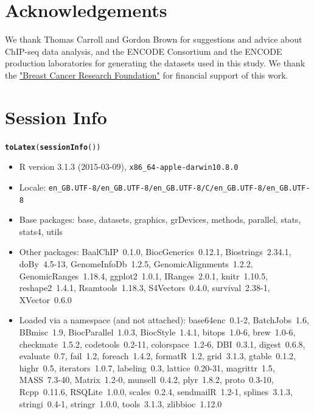 \documentclass{article}\usepackage[]{graphicx}\usepackage[usenames,dvipsnames]{color}
\makeatletter
\newcommand{\hlstd}[1]{\textcolor[rgb]{0.345,0.345,0.345}{#1}}%
\newcommand{\hlkwd}[1]{\textcolor[rgb]{0.737,0.353,0.396}{\textbf{#1}}}%
\newenvironment{kframe}{%
 \def\at@end@of@kframe{}%
 \ifinner\ifhmode%
  \def\at@end@of@kframe{\end{minipage}}%
  \begin{minipage}{\columnwidth}%
 \fi\fi%
 \def\FrameCommand##1{\hskip\@totalleftmargin \hskip-\fboxsep
 \colorbox{shadecolor}{##1}\hskip-\fboxsep
     \hskip-\linewidth \hskip-\@totalleftmargin \hskip\columnwidth}%
 \MakeFramed {\advance\hsize-\width
   \@totalleftmargin\z@ \linewidth\hsize
   \@setminipage}}%
 {\par\unskip\endMakeFramed%
 \at@end@of@kframe}
\makeatother
\begin{document}



\section*{Acknowledgements}
We thank Thomas Carroll and Gordon Brown for suggestions and advice about ChIP-seq data analysis, and the ENCODE Consortium and the ENCODE production laboratories for generating the datasets used in this study. We thank the \href{https://give.bcrfcure.org/checkout/donation?eid=31404&_ga=1.141086386.1225939115.1465824174}{"Breast Cancer Research Foundation"} for financial support of this work.


\section*{Session Info}
\begin{kframe}
\begin{alltt}
\hlkwd{toLatex}\hlstd{(}\hlkwd{sessionInfo}\hlstd{())}
\end{alltt}
\end{kframe}\begin{itemize}\raggedright
  \item R version 3.1.3 (2015-03-09), \verb|x86_64-apple-darwin10.8.0|
  \item Locale: \verb|en_GB.UTF-8/en_GB.UTF-8/en_GB.UTF-8/C/en_GB.UTF-8/en_GB.UTF-8|
  \item Base packages: base, datasets, graphics, grDevices, methods, parallel,
    stats, stats4, utils
  \item Other packages: BaalChIP~0.1.0, BiocGenerics~0.12.1, Biostrings~2.34.1,
    doBy~4.5-13, GenomeInfoDb~1.2.5, GenomicAlignments~1.2.2,
    GenomicRanges~1.18.4, ggplot2~1.0.1, IRanges~2.0.1, knitr~1.10.5,
    reshape2~1.4.1, Rsamtools~1.18.3, S4Vectors~0.4.0, survival~2.38-1,
    XVector~0.6.0
  \item Loaded via a namespace (and not attached): base64enc~0.1-2,
    BatchJobs~1.6, BBmisc~1.9, BiocParallel~1.0.3, BiocStyle~1.4.1,
    bitops~1.0-6, brew~1.0-6, checkmate~1.5.2, codetools~0.2-11,
    colorspace~1.2-6, DBI~0.3.1, digest~0.6.8, evaluate~0.7, fail~1.2,
    foreach~1.4.2, formatR~1.2, grid~3.1.3, gtable~0.1.2, highr~0.5,
    iterators~1.0.7, labeling~0.3, lattice~0.20-31, magrittr~1.5, MASS~7.3-40,
    Matrix~1.2-0, munsell~0.4.2, plyr~1.8.2, proto~0.3-10, Rcpp~0.11.6,
    RSQLite~1.0.0, scales~0.2.4, sendmailR~1.2-1, splines~3.1.3, stringi~0.4-1,
    stringr~1.0.0, tools~3.1.3, zlibbioc~1.12.0
\end{itemize}
\end{document}
